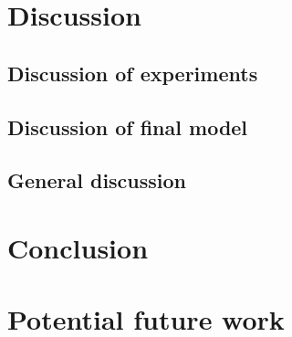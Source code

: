\documentclass[a4paper]{article}
\begin{document}
\subsection{}

\section{Discussion}
\subsection{Discussion of experiments}
\subsection{Discussion of final model}
\subsection{General discussion}

\section{Conclusion}

\section{Potential future work}



{}

\end{document}
